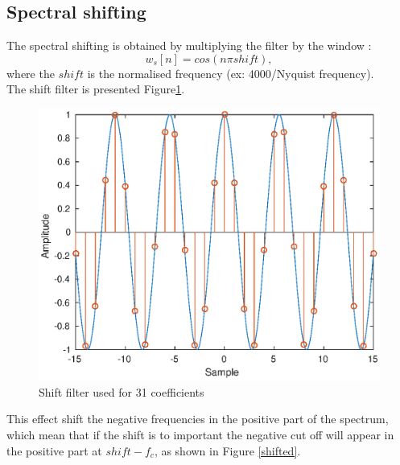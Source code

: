 \documentclass[twoside,twocolumn]{article}
\begin{document}
\subsection{Spectral shifting}
The spectral shifting is obtained by multiplying the filter by the window :
\begin{equation}
w_s[n]=cos(n\pi shift),
\end{equation}
	where the $shift$ is the normalised frequency (ex: 4000/Nyquist frequency).\\
	The shift filter is presented Figure\ref{shiftfilt}. 
	\begin{figure}[h!]
		\centering
		\includegraphics[scale=0.5]{./images/shiftfilt.eps}
		\caption{Shift filter used for 31 coefficients}
		\label{shiftfilt}
	\end{figure}
This effect shift the negative frequencies in the positive part of the spectrum, which mean that if the shift is to important the negative cut off will appear in the positive part at $shift-f_c$, as shown in Figure \ref{shifted}. 
\end{document}
